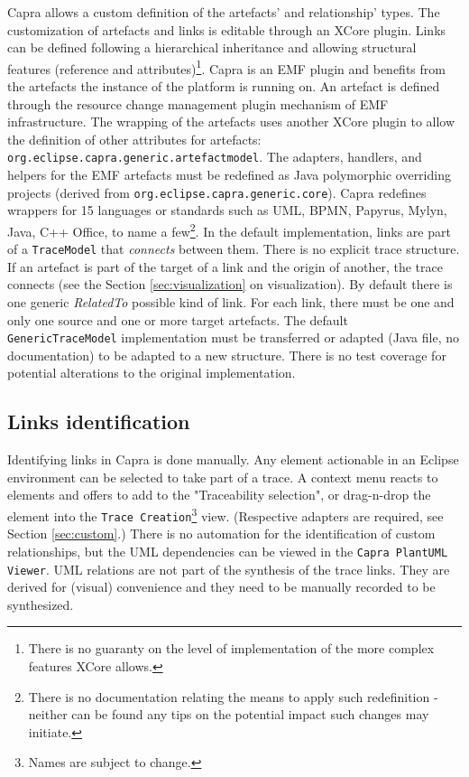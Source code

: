 Capra allows a custom definition of the artefacts' and relationship' types.  The customization of artefacts and links is editable through an XCore plugin.  Links can be defined following a hierarchical inheritance and allowing structural features (reference and attributes)\footnote{There is no guaranty on the level of implementation of the more complex features XCore allows.}. 
Capra is an EMF plugin and benefits from the artefacts the instance of the platform is running on. An artefact is defined through the resource change management plugin mechanism of EMF infrastructure. The wrapping of the artefacts uses another XCore plugin to allow the definition of other attributes for artefacts: \verb|org.eclipse.capra.generic.artefactmodel|.
The adapters, handlers, and helpers for the EMF artefacts must be redefined as Java polymorphic overriding projects (derived from \verb|org.eclipse.capra.generic.core|).  
Capra redefines wrappers for 15 languages or standards such as UML, BPMN, Papyrus, Mylyn, Java, C++ Office, to name a few\footnote{There is no documentation relating the means to apply such redefinition - neither can be found any tips on the potential impact such changes may initiate.}. 
In the default implementation, links are part of a \texttt{TraceModel} that \textit{connects} between them. There is no explicit trace structure. 
If an artefact is part of the target of a link and the origin of another, the trace connects (see the Section \ref{sec:visualization} on visualization). By default there is one generic \textit{RelatedTo} possible kind of link. For each link, there must be one and only one source and one or more target artefacts.
The default \texttt{GenericTraceModel} implementation must be transferred or adapted (Java file, no documentation) to be adapted to a new structure. There is no test coverage for potential alterations to the original implementation.


\subsection{Links identification}\label{sec:identification}
Identifying links in Capra is done manually. Any element actionable in an Eclipse environment can be selected to take part of a trace. A context menu reacts to elements and offers to add to the "Traceability selection", or drag-n-drop the element into the \texttt{Trace Creation}\footnote{Names are subject to change.} view. (Respective adapters are required, see Section \ref{sec:custom}.)
There is no automation for the identification of custom relationships, but the UML dependencies can be viewed in the \texttt{Capra PlantUML Viewer}. UML relations are not part of the synthesis of the trace links. They are derived for (visual) convenience and they need to be manually recorded to be synthesized.


